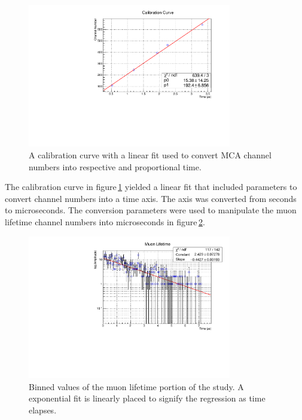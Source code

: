 \documentclass[aps,prl,twocolumn,superscriptaddress,nofootinbib]{revtex4-1}
\begin{document}
\begin{figure}[h!]
  \begin{center}
\centerline{\includegraphics[width=3.5in]{calib2.pdf}}
\caption{ \small{A calibration curve with a linear fit used to convert MCA channel numbers into respective and proportional time. \label{calibration}}}
  \end{center}
\end{figure}
\vfill\eject
The calibration curve in figure\,\ref{calibration} yielded a linear fit that included parameters to convert channel numbers into a time axis. The axis was converted from seconds to microseconds. The conversion parameters were used to manipulate the muon lifetime channel numbers into microseconds in figure\,\ref{life}.


\begin{figure}[h!]
  \begin{center}
\centerline{\includegraphics[width=3.5in]{muonlifetime2.pdf}}
\caption{ \small{Binned values of the muon lifetime portion of the study. A exponential fit is linearly placed to signify the regression as time elapses. \label{life}}}
  \end{center}
\end{figure}
\end{document}

